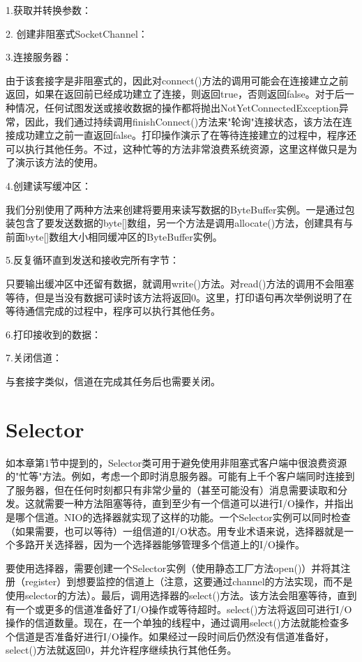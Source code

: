 	

	1.获取并转换参数：

	2. 创建非阻塞式SocketChannel：

	3.连接服务器：

	由于该套接字是非阻塞式的，因此对connect()方法的调用可能会在连接建立之前返回，如果在返回前已经成功建立了连接，则返回true，否则返回false。对于后一种情况，任何试图发送或接收数据的操作都将抛出NotYetConnectedException异常，因此，我们通过持续调用finishConnect()方法来"轮询"连接状态，该方法在连接成功建立之前一直返回false。打印操作演示了在等待连接建立的过程中，程序还可以执行其他任务。不过，这种忙等的方法非常浪费系统资源，这里这样做只是为了演示该方法的使用。 

	4.创建读写缓冲区：

	我们分别使用了两种方法来创建将要用来读写数据的ByteBuffer实例。一是通过包装包含了要发送数据的byte[]数组，另一个方法是调用allocate()方法，创建具有与前面byte[]数组大小相同缓冲区的ByteBuffer实例。 

	5.反复循环直到发送和接收完所有字节：

	只要输出缓冲区中还留有数据，就调用write()方法。对read()方法的调用不会阻塞等待，但是当没有数据可读时该方法将返回0。这里，打印语句再次举例说明了在等待通信完成的过程中，程序可以执行其他任务。 

	6.打印接收到的数据：

	7.关闭信道：

	与套接字类似，信道在完成其任务后也需要关闭。 

\section{Selector} 

	如本章第1节中提到的，Selector类可用于避免使用非阻塞式客户端中很浪费资源的"忙等"方法。例如，考虑一个即时消息服务器。可能有上千个客户端同时连接到了服务器，但在任何时刻都只有非常少量的（甚至可能没有）消息需要读取和分发。这就需要一种方法阻塞等待，直到至少有一个信道可以进行I/O操作，并指出是哪个信道。NIO的选择器就实现了这样的功能。一个Selector实例可以同时检查（如果需要，也可以等待）一组信道的I/O状态。用专业术语来说，选择器就是一个多路开关选择器，因为一个选择器能够管理多个信道上的I/O操作。 

	要使用选择器，需要创建一个Selector实例（使用静态工厂方法open()）并将其注册（register）到想要监控的信道上（注意，这要通过channel的方法实现，而不是使用selector的方法）。最后，调用选择器的select()方法。该方法会阻塞等待，直到有一个或更多的信道准备好了I/O操作或等待超时。select()方法将返回可进行I/O操作的信道数量。现在，在一个单独的线程中，通过调用select()方法就能检查多个信道是否准备好进行I/O操作。如果经过一段时间后仍然没有信道准备好，select()方法就返回0，并允许程序继续执行其他任务。 

